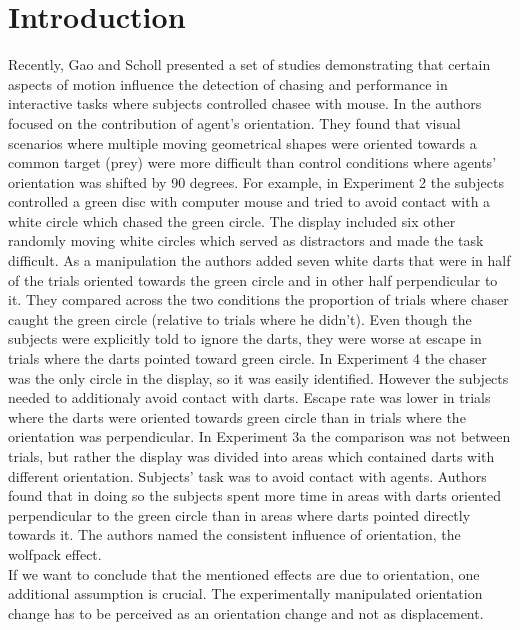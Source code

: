 \documentclass{article}
\begin{document}
\section{Introduction}
Recently, Gao and Scholl presented a set of studies \citep{gao09,gao10,gao11} demonstrating that certain aspects of motion influence the detection of chasing and performance in interactive tasks where subjects controlled chasee with mouse. 
In \citet{gao10} the authors focused on the contribution of agent's orientation. 
They found that visual scenarios where multiple moving geometrical shapes were oriented towards a common target (prey) were more difficult than control conditions where agents' orientation was shifted by 90 degrees. 
For example, in Experiment 2 the subjects controlled a green disc with computer mouse and tried to avoid contact with a white circle which chased the green circle. 
The display included six other randomly moving white circles which served as distractors and made the task difficult. 
As a manipulation the authors added seven white darts that were in half of the trials oriented towards the green circle and in other half perpendicular to it. 
They compared across the two conditions the proportion of trials where chaser caught the green circle (relative to trials where he didn't). 
Even though the subjects were explicitly told to ignore the darts, they were worse at escape in trials where the darts pointed toward green circle. 
In Experiment 4 the chaser was the only circle in the display, so it was easily identified. 
However the subjects needed to additionaly avoid contact with darts. 
Escape rate was lower in trials where the darts were oriented towards green circle than in trials where the orientation was perpendicular. 
In Experiment 3a the comparison was not between trials, but rather the display was divided into areas which contained darts with different orientation. 
Subjects' task was to avoid contact with agents. 
Authors found that in doing so the subjects spent more time in areas with darts oriented perpendicular to the green circle than in areas where darts pointed directly towards it.
The authors named the consistent influence of orientation, the wolfpack effect.\\
If we want to conclude that the mentioned effects are due to orientation, one additional assumption is crucial. 
The experimentally manipulated orientation change has to be perceived as an orientation change and not as displacement. 
\end{document}
